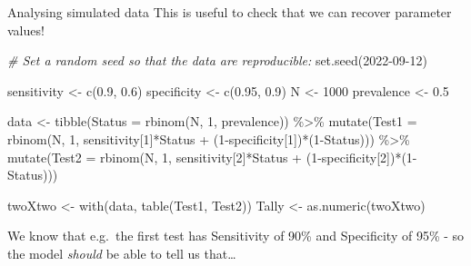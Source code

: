 \documentclass[
  ignorenonframetext,
  aspectratio=169,
]{beamer}
\newenvironment{Shaded}{\begin{snugshade}}{\end{snugshade}}
\newcommand{\AttributeTok}[1]{\textcolor[rgb]{0.77,0.63,0.00}{#1}}
\newcommand{\CommentTok}[1]{\textcolor[rgb]{0.56,0.35,0.01}{\textit{#1}}}
\newcommand{\DecValTok}[1]{\textcolor[rgb]{0.00,0.00,0.81}{#1}}
\newcommand{\FloatTok}[1]{\textcolor[rgb]{0.00,0.00,0.81}{#1}}
\newcommand{\FunctionTok}[1]{\textcolor[rgb]{0.00,0.00,0.00}{#1}}
\newcommand{\NormalTok}[1]{#1}
\newcommand{\OtherTok}[1]{\textcolor[rgb]{0.56,0.35,0.01}{#1}}
\newcommand{\SpecialCharTok}[1]{\textcolor[rgb]{0.00,0.00,0.00}{#1}}
\begin{document}
\begin{frame}[fragile]{Analysing simulated data}
\protect\hypertarget{analysing-simulated-data}{}
This is useful to check that we can recover parameter values!

\scriptsize

\begin{Shaded}
\begin{Highlighting}[]
\CommentTok{\# Set a random seed so that the data are reproducible:}
\FunctionTok{set.seed}\NormalTok{(}\DecValTok{2022{-}09{-}12}\NormalTok{)}

\NormalTok{sensitivity }\OtherTok{\textless{}{-}} \FunctionTok{c}\NormalTok{(}\FloatTok{0.9}\NormalTok{, }\FloatTok{0.6}\NormalTok{)}
\NormalTok{specificity }\OtherTok{\textless{}{-}} \FunctionTok{c}\NormalTok{(}\FloatTok{0.95}\NormalTok{, }\FloatTok{0.9}\NormalTok{)}
\NormalTok{N }\OtherTok{\textless{}{-}} \DecValTok{1000}
\NormalTok{prevalence }\OtherTok{\textless{}{-}} \FloatTok{0.5}

\NormalTok{data }\OtherTok{\textless{}{-}} \FunctionTok{tibble}\NormalTok{(}\AttributeTok{Status =} \FunctionTok{rbinom}\NormalTok{(N, }\DecValTok{1}\NormalTok{, prevalence)) }\SpecialCharTok{\%\textgreater{}\%}
  \FunctionTok{mutate}\NormalTok{(}\AttributeTok{Test1 =} \FunctionTok{rbinom}\NormalTok{(N, }\DecValTok{1}\NormalTok{, sensitivity[}\DecValTok{1}\NormalTok{]}\SpecialCharTok{*}\NormalTok{Status }\SpecialCharTok{+}\NormalTok{ (}\DecValTok{1}\SpecialCharTok{{-}}\NormalTok{specificity[}\DecValTok{1}\NormalTok{])}\SpecialCharTok{*}\NormalTok{(}\DecValTok{1}\SpecialCharTok{{-}}\NormalTok{Status))) }\SpecialCharTok{\%\textgreater{}\%}
  \FunctionTok{mutate}\NormalTok{(}\AttributeTok{Test2 =} \FunctionTok{rbinom}\NormalTok{(N, }\DecValTok{1}\NormalTok{, sensitivity[}\DecValTok{2}\NormalTok{]}\SpecialCharTok{*}\NormalTok{Status }\SpecialCharTok{+}\NormalTok{ (}\DecValTok{1}\SpecialCharTok{{-}}\NormalTok{specificity[}\DecValTok{2}\NormalTok{])}\SpecialCharTok{*}\NormalTok{(}\DecValTok{1}\SpecialCharTok{{-}}\NormalTok{Status)))}

\NormalTok{twoXtwo }\OtherTok{\textless{}{-}} \FunctionTok{with}\NormalTok{(data, }\FunctionTok{table}\NormalTok{(Test1, Test2))}
\NormalTok{Tally }\OtherTok{\textless{}{-}} \FunctionTok{as.numeric}\NormalTok{(twoXtwo)}
\end{Highlighting}
\end{Shaded}

\normalsize

\pause

We know that e.g.~the first test has Sensitivity of 90\% and Specificity
of 95\% - so the model \emph{should} be able to tell us that\ldots{}
\end{frame}
\end{document}
